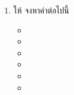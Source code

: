 \begin{enumerate}
\item ให้  จงหาค่าต่อไปนี้
\begin{itemize}
\item {}
\item {}
\item {}
\item {}
\item {}
\item {}

\end{itemize}
\end{enumerate}








